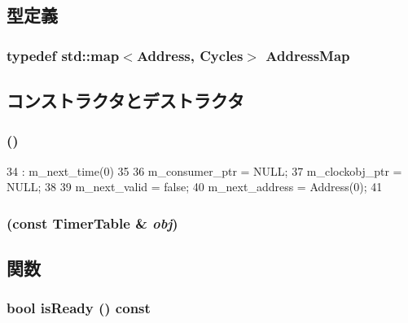 \subsection{型定義}
\hypertarget{classTimerTable_aafe31722aec34a121c4566b713a7a5e8}{
\subsubsection[{AddressMap}]{\setlength{\rightskip}{0pt plus 5cm}typedef std::map$<${\bf Address}, {\bf Cycles}$>$ {\bf AddressMap}}}
\label{classTimerTable_aafe31722aec34a121c4566b713a7a5e8}


\subsection{コンストラクタとデストラクタ}
\hypertarget{classTimerTable_a962081e7b878ea1c7019cc69a78dc8f2}{
\subsubsection[{TimerTable}]{ ()}}
\label{classTimerTable_a962081e7b878ea1c7019cc69a78dc8f2}



\begin{DoxyCode}
34     : m_next_time(0)
35 {
36     m_consumer_ptr  = NULL;
37     m_clockobj_ptr = NULL;
38 
39     m_next_valid = false;
40     m_next_address = Address(0);
41 }
\end{DoxyCode}
\hypertarget{classTimerTable_a9764098760fd28d90c29721b03c37840}{
\subsubsection[{TimerTable}]{ (const {\bf TimerTable} \& {\em obj})}}
\label{classTimerTable_a9764098760fd28d90c29721b03c37840}


\subsection{関数}
\hypertarget{classTimerTable_ac12eec09d47a89a1ddf3eb6bb19b5bd3}{
\subsubsection[{isReady}]{\setlength{\rightskip}{0pt plus 5cm}bool isReady () const}}
\label{classTimerTable_ac12eec09d47a89a1ddf3eb6bb19b5bd3}



